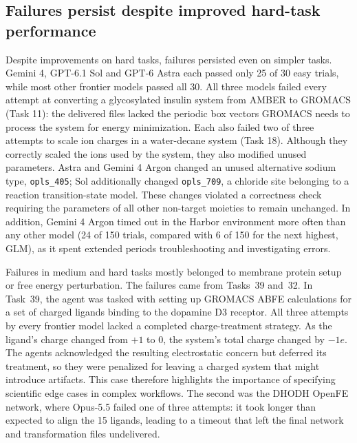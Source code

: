 \subsection{Failures persist despite improved hard-task performance}

Despite improvements on hard tasks, failures persisted even on simpler tasks. Gemini 4, GPT-6.1 Sol and GPT-6 Astra each passed only 25 of 30 easy trials, while most other frontier models passed all 30. All three models failed every attempt at converting a glycosylated insulin system from AMBER to GROMACS (Task 11): the delivered files lacked the periodic box vectors GROMACS needs to process the system for energy minimization. Each also failed two of three attempts to scale ion charges in a water-decane system (Task 18). Although they correctly scaled the ions used by the system, they also modified unused parameters. Astra and Gemini 4 Argon changed an unused alternative sodium type, \texttt{opls\_405}; Sol additionally changed \texttt{opls\_709}, a chloride site belonging to a reaction transition-state model. These changes violated a correctness check requiring the parameters of all other non-target moieties to remain unchanged. In addition, Gemini 4 Argon timed out in the Harbor environment more often than any other model (24 of 150 trials, compared with 6 of 150 for the next highest, GLM), as it spent extended periods troubleshooting and investigating errors.

Failures in medium and hard tasks mostly belonged to membrane protein setup or free energy perturbation. The failures came from Tasks~39 and~32. In Task~39, the agent was tasked with setting up GROMACS ABFE calculations for a set of charged ligands binding to the dopamine D3 receptor. All three attempts by every frontier model lacked a completed charge-treatment strategy. As the ligand's charge changed from $+1$ to $0$, the system's total charge changed by $-1e$. The agents acknowledged the resulting electrostatic concern but deferred its treatment, so they were penalized for leaving a charged system that might introduce artifacts. This case therefore highlights the importance of specifying scientific edge cases in complex workflows. The second was the DHODH OpenFE network, where Opus-5.5 failed one of three attempts: it took longer than expected to align the 15 ligands, leading to a timeout that left the final network and transformation files undelivered.

